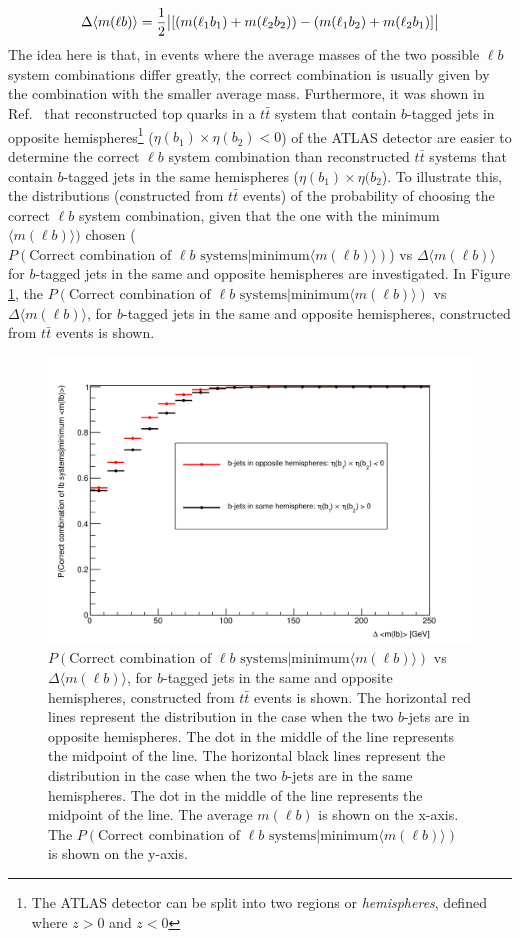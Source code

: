 \begin{equation}
    \Delta \langle m(\ell b) \rangle = \frac{1}{2} \abs{[( m(\ell_{1} b_{1}) + m(\ell_{2} b_{2}) ) - ( m(\ell_{1} b_{2}) + m(\ell_{2} b_{1}) ]}
\end{equation}
The idea here is that, in events where the average masses of the two possible $\ell b$ system combinations differ greatly, the correct combination is usually given by the combination with the smaller average mass. Furthermore, it was shown in Ref.~\cite{2vSM-ref1} that reconstructed top quarks in a $t\bar{t}$ system that contain $b$-tagged jets in opposite hemispheres\footnote{The ATLAS detector can be split into two regions or \textit{hemispheres}, defined where $z > 0$ and $z < 0$} ($\eta(b_{1}) \times \eta(b_{2}) < 0$) of the ATLAS detector are easier to determine the correct $\ell b$ system combination than reconstructed $t\bar{t}$ systems that contain $b$-tagged jets in the same hemispheres ($\eta(b_{1}) \times \eta(b_{2}$). To illustrate this, the distributions (constructed from $t\bar{t}$ events) of the probability of choosing the correct $\ell b$ system combination, given that the one with the minimum $\langle m(\ell b) \rangle)$ chosen ($P(\text{Correct combination of } \ell b \text{ systems} | \text{minimum} \langle m(\ell b) \rangle)$) vs $\Delta \langle m(\ell b) \rangle$ for $b$-tagged jets in the same and opposite hemispheres are investigated. In Figure \ref{fig:lb-assoc}, the $P(\text{Correct combination of } \ell b \text{ systems} | \text{minimum} \langle m(\ell b) \rangle)$ vs $\Delta \langle m(\ell b) \rangle$, for $b$-tagged jets in the same and opposite hemispheres, constructed from $t\bar{t}$ events is shown.
 \begin{figure}[h!]
	\includegraphics[width=0.6\linewidth]{figures/lbassoc_2vSM.png}
	\centering
	\caption{$P(\text{Correct combination of } \ell b \text{ systems} | \text{minimum} \langle m(\ell b) \rangle)$ vs $\Delta \langle m(\ell b) \rangle$, for $b$-tagged jets in the same and opposite hemispheres, constructed from $t\bar{t}$ events is shown. The horizontal red lines represent the distribution in the case when the two $b$-jets are in opposite hemispheres. The dot in the middle of the line represents the midpoint of the line. The horizontal black lines represent the distribution in the case when the two $b$-jets are in the same hemispheres. The dot in the middle of the line represents the midpoint of the line. The average $m(\ell b)$ is shown on the x-axis. The $P(\text{Correct combination of } \ell b \text{ systems} | \text{minimum} \langle m(\ell b) \rangle)$ is shown on the y-axis.}
	\label{fig:lb-assoc}
\end{figure}


